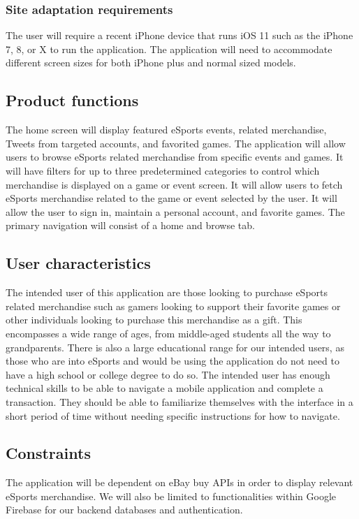 \documentclass[onecolumn, draftclsnofoot,10pt, compsoc]{IEEEtran}
\begin{document}
\subsubsection{Site adaptation requirements}
The user will require a recent iPhone device that runs iOS 11 such as the iPhone 7, 8, or X to run the application. The application will need to accommodate different screen sizes for both iPhone plus and normal sized models. 

\subsection{Product functions}
The home screen will display featured eSports events, related merchandise, Tweets from targeted accounts, and favorited games. The application will allow users to browse eSports related merchandise from specific events and games. It will have filters for up to three predetermined categories to control which merchandise is displayed on a game or event screen. It will allow users to fetch eSports merchandise related to the game or event selected by the user. It will allow the user to sign in, maintain a personal account, and favorite games. The primary navigation will consist of a home and browse tab.  

\subsection{User characteristics}
The intended user of this application are those looking to purchase eSports related merchandise such as gamers looking to support their favorite games or other individuals looking to purchase this merchandise as a gift. This encompasses a wide range of ages, from middle-aged students all the way to grandparents. There is also a large educational range for our intended users, as those who are into eSports and would be using the application do not need to have a high school or college degree to do so. The intended user has enough technical skills to be able to navigate a mobile application and complete a transaction. They should be able to familiarize themselves with the interface in a short period of time without needing specific instructions for how to navigate.

\subsection{Constraints}
The application will be dependent on eBay buy APIs in order to display relevant eSports merchandise. We will also be limited to functionalities within Google Firebase for our backend databases and authentication. 
\end{document}
